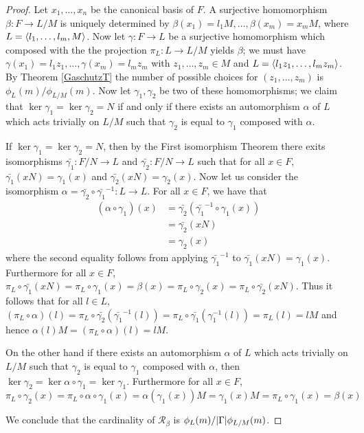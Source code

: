 \begin{proof}
    Let $x_1,\ldots , x_n$ be the canonical basis of $F$. 
    A surjective homomorphism $\beta : F \longrightarrow L/M$ is uniquely determined by $\beta(x_1) = l_1M, \ldots , \beta(x_m) = x_mM$, where $L = \langle l_1,\ldots ,l_m, M \rangle$. 
    Now let $\gamma : F \longrightarrow L$ be a surjective homomorphism which composed with the the projection $\pi_L \colon L \longrightarrow L/M$ yields $\beta$; we must have $\gamma(x_1) = l_1z_1,\ldots ,\gamma(x_m)=l_mz_m$ with $z_1,\ldots , z_m \in M$ and $L = \langle l_1z_1,\ldots ,l_mz_m \rangle$. By Theorem \ref{GaschutzT} the number of possible choices for $(z_1,\ldots ,z_m)$ is $\phi_L(m)/\phi_{L/M}(m)$. Now let $\gamma_1, \gamma_2$ be two of these homomorphisms; we claim that $\ker \gamma_1 = \ker \gamma_2 = N$ if and only if there exists an automorphism $\alpha$ of $L$ which acts trivially on $L/M$ such that $\gamma_2$ is equal to $\gamma_1$ composed with $\alpha$. 
    
    If $\ker \gamma_1 = \ker \gamma_2 = N$, then by the First isomorphism Theorem there exits isomorphisms $\bar{\gamma_1} \colon F/N \rightarrow L$ and $\bar{\gamma_2} \colon F/N \rightarrow L$ such that for all $x \in F$, $\bar{\gamma_1}(xN) = \gamma_1(x)$ and $\bar{\gamma_2}(xN) = \gamma_2(x)$. Now let us consider the isomorphism $\alpha = \bar{\gamma_2} \circ \bar{\gamma_1}^{-1} \colon L \rightarrow L.$ For all $x \in F$, we have that
    \begin{align*}
        (\alpha \circ \gamma_1)(x) &=  \bar{\gamma_2} (\bar{\gamma_1}^{-1}\circ \gamma_1(x)) \\
        &= \bar{\gamma_2}(xN) \\
        &= \gamma_2(x)
    \end{align*}
    where the second equality follows from applying $\bar{\gamma_1}^{-1}$ to $\bar{\gamma_1}(xN) = \gamma_1(x)$. Furthermore for all $x \in F$,
    $\pi_L \circ \bar{\gamma_1}(xN) = \pi_L \circ \gamma_1(x) = \beta(x) = \pi_L \circ \gamma_2(x) = \pi_L \circ \bar{\gamma_2}(xN)$. Thus it follows that for all $l \in L$, $(\pi_L \circ \alpha)(l) = \pi_L \circ \bar{\gamma_2}(\bar{\gamma_1}^{-1}(l)) = \pi_L \circ \bar{\gamma_1}(\gamma_1^{-1}(l)) = \pi_L(l) = lM$ and hence $\alpha(l)M = (\pi_L \circ \alpha)(l) = lM$.

    On the other hand if there exists an automorphism $\alpha$ of $L$ which acts trivially on $L/M$ such that $\gamma_2$ is equal to $\gamma_1$ composed with $\alpha$, then $\ker \gamma_2 = \ker \alpha \circ \gamma_1 = \ker \gamma_1$. Furthermore for all $x \in F$, $\pi_L \circ \gamma_2(x) = \pi_L \circ \alpha \circ \gamma_1(x) = \alpha(\gamma_1(x))M = \gamma_1(x)M = \pi_L \circ \gamma_1(x) = \beta(x)$

    We conclude that the cardinality of $\mathscr{R}_\beta$ is $\phi_L(m)/| \Gamma |\phi_{L/M}(m)$.
\end{proof}

